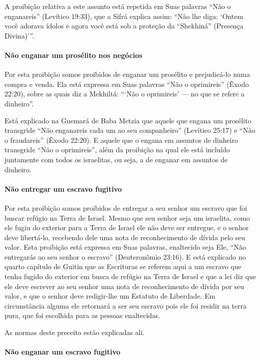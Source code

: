 A proibição relativa a este assunto está repetida em Suas palavras ``Não
o enganareis'' (Levítico 19:33), que a Sifrá explica assim: ``Não lhe
diga: `Ontem você adorava ídolos e agora você está sob a proteção da
``Shekhiná'' (Presença Divina)'''.

\paragraph{Não enganar um prosélito nos negócios}

Por esta proibição somos proibidos de enganar um prosélito e
prejudicá-lo numa compra e venda. Ela está expressa em Suas palavras
``Não o oprimireis'' (Êxodo 22:20), sobre as quais diz a Mekhiltá: ```Não o
oprimireis' --- no que se refere a dinheiro''.

Está explicado na Guemará de Baba Metzia que aquele que engana um
prosélito transgride ``Não enganareis cada um ao seu companheiro''
(Levítico 25:17) e ``Não o fraudareis'' (Êxodo 22:20). E aquele que o
engana em assuntos de dinheiro transgride ``Não o oprimireis'', além da
proibição na qual ele está incluído juntamente com todos os israelitas,
ou seja, a de enganar em assuntos de dinheiro.

\paragraph{Não entregar um escravo fugitivo}

Por esta proibição somos proibidos de entregar a seu senhor um escravo
que foi buscar refúgio na Terra de Israel. Mesmo que seu senhor seja um
israelita, como ele fugiu do exterior para a Terra de Israel ele não
deve ser entregue, e o senhor deve libertá-lo, recebendo dele uma nota
de reconhecimento de dívida pelo seu valor. Esta proibição está
expressa em Suas palavras, enaltecido seja Ele, ``Não entregarás ao seu
senhor o escravo'' (Deuteronômio 23:16). E está explicado no quarto
capítulo de Guitin que as Escrituras se referem aqui a um escravo que
tenha fugido do exterior em busca de refúgio na Terra de Israel e que a
lei diz que ele deve escrever ao seu senhor uma nota de reconhecimento
de dívida por seu valor, e que o senhor deve redigir-lhe um Estatuto de
Liberdade. Em circunstância alguma ele retornará a ser seu escravo pois
ele foi residir na terra pura, que foi escolhida para as pessoas
enaltecidas.

As normas deste preceito estão explicadas ali.

\paragraph{Não enganar um escravo fugitivo}

